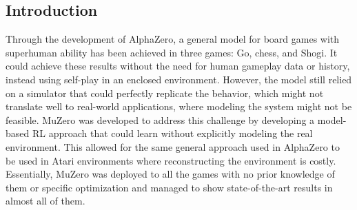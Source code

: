 \subsection*{Introduction}
Through the development of AlphaZero, a general model for board games with superhuman ability has 
been achieved in three games: Go, chess, and Shogi. It could achieve these results without the need for 
human gameplay data or history, instead using self-play in an enclosed environment. However, the 
model still relied on a simulator that could perfectly replicate the behavior, which might not translate 
well to real-world applications, where modeling the system might not be feasible. MuZero 
was developed to address this challenge by developing a model-based RL approach that could learn 
without explicitly modeling the real environment. This allowed for the same general approach used in 
AlphaZero to be used in Atari environments where reconstructing the environment is costly. Essentially, 
MuZero was deployed to all the games with no prior knowledge of them or specific optimization and 
managed to show state-of-the-art results in almost all of them.

